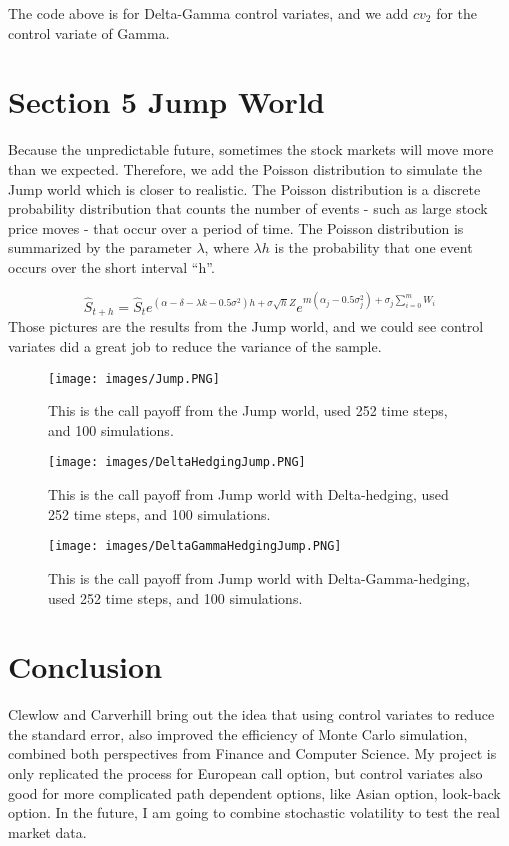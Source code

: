 \documentclass[11pt,]{article}
\makeatletter
\def\maxwidth{\ifdim\Gin@nat@width>\linewidth\linewidth
\else\Gin@nat@width\fi}
\let\Oldincludegraphics\includegraphics
\renewcommand{\includegraphics}[1]{\Oldincludegraphics[width=\maxwidth]{#1}}
\makeatother
\begin{document}
The code above is for Delta-Gamma control variates, and we add \(cv_2\)
for the control variate of Gamma.

\section{Section 5 Jump World}\label{section-5-jump-world}

Because the unpredictable future, sometimes the stock markets will move
more than we expected. Therefore, we add the Poisson distribution to
simulate the Jump world which is closer to realistic. The Poisson
distribution is a discrete probability distribution that counts the
number of events - such as large stock price moves - that occur over a
period of time. The Poisson distribution is summarized by the parameter
\(\lambda\), where \(\lambda h\) is the probability that one event
occurs over the short interval ``h''.

\[
\hat{S}_{t+h} = \hat{S}_te^{(\alpha-\delta-\lambda k - 0.5\sigma^2)h+\sigma\sqrt hZ}e^{m(\alpha_j-0.5\sigma^2_j)+\sigma_j\sum^m_{i=0}W_i}
\] Those pictures are the results from the Jump world, and we could see
control variates did a great job to reduce the variance of the sample.

\begin{figure}
\centering
\texttt{[image: images/Jump.PNG]}
\caption{This is the call payoff from the Jump world, used 252 time
steps, and 100 simulations.}
\end{figure}

\begin{figure}
\centering
\texttt{[image: images/DeltaHedgingJump.PNG]}
\caption{This is the call payoff from Jump world with Delta-hedging,
used 252 time steps, and 100 simulations.}
\end{figure}

\begin{figure}
\centering
\texttt{[image: images/DeltaGammaHedgingJump.PNG]}
\caption{This is the call payoff from Jump world with
Delta-Gamma-hedging, used 252 time steps, and 100 simulations.}
\end{figure}

\section{Conclusion}\label{conclusion}

Clewlow and Carverhill bring out the idea that using control variates to
reduce the standard error, also improved the efficiency of Monte Carlo
simulation, combined both perspectives from Finance and Computer
Science. My project is only replicated the process for European call
option, but control variates also good for more complicated path
dependent options, like Asian option, look-back option. In the future, I
am going to combine stochastic volatility to test the real market data.

\newpage
\singlespacing 

\end{document}
